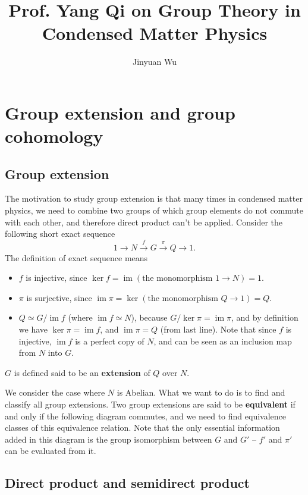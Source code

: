 \documentclass[hyperref, a4paper]{article}
\title{Prof. Yang Qi on Group Theory in Condensed Matter Physics}
\author{Jinyuan Wu}
\newcommand*{\concept}[1]{{\textbf{#1}}}
\DeclareMathOperator{\im}{im}
\begin{document}
\maketitle

\section{Group extension and group cohomology}

\subsection{Group extension}

The motivation to study group extension is that many times in condensed matter physics, we need to combine two 
groups of which group elements do not commute with each other, and therefore direct product can't be applied.
Consider the following short exact sequence
\begin{equation}
    1 \to N \stackrel{f}{\to} G \stackrel{\pi}{\to} Q \to 1.
    \label{eq:short-exact-sequence-group}
\end{equation}
The definition of exact sequence means 
\begin{itemize}
    \item $f$ is injective, since $\ker f = \im (\text{the monomorphism $1 \to N$}) = 1$.
    \item $\pi$ is surjective, since $\im \pi = \ker (\text{the monomorphism $Q \to 1$}) = Q$.
    \item $Q \simeq G / \im{f}$ (where $\im{f} \simeq N$), because $G / \ker \pi = \im \pi$, and by definition we have $\ker \pi = \im f$,
    and $\im \pi = Q$ (from last line). Note that since $f$ is injective, $\im f$ is a perfect copy of $N$,
    and can be seen as an inclusion map from $N$ into $G$.
\end{itemize}
$G$ is defined said to be an \concept{extension} of $Q$ over $N$. 

We consider the case where $N$ is Abelian. What we want to do is to find and classify all group extensions.
Two group extensions are said to be \concept{equivalent} if and only if the following diagram 
 commutes, and we need to find equivalence classes of 
this equivalence relation. Note that the only essential information added in this diagram is the 
group isomorphism between $G$ and $G'$ -- $f'$ and $\pi'$ can be evaluated from it.

\subsection{Direct product and semidirect product}\label{sec:direct-product-semi-direct}
\end{document}
